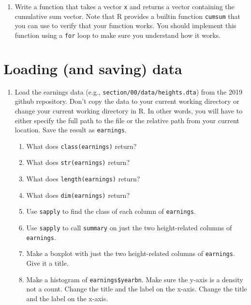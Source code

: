 \documentclass{article}
\begin{document}
\begin{enumerate}
\item Write a function that takes a vector \texttt{x} and returns a vector
      containing the cumulative sum vector.  Note that R provides a builtin
      function \texttt{cumsum} that you can use to verify that your function
      works.  You should implement this function using a \texttt{for} loop
      to make sure you understand how it works.

\end{enumerate}

\section*{Loading (and saving) data}

\begin{enumerate}

\item Load the earnings data (e.g., \texttt{section/00/data/heights.dta}) from the 2019 github repository.
      Don't copy the data to your
      current working directory or change your current working directory in
      R.  In other words, you will have to either specify the full path
      to the file or the relative path from your current location.  Save
      the result as \texttt{earnings}.

    \begin{enumerate}
    \item What does \texttt{class(earnings)} return?
    \item What does \texttt{str(earnings)} return?
    \item What does \texttt{length(earnings)} return?
    \item What does \texttt{dim(earnings)} return?
    \item Use \texttt{sapply} to find the class of each column of
          \texttt{earnings}.
    \item Use \texttt{sapply} to call \texttt{summary} on just the two
          height-related columns of \texttt{earnings}.
    \item Make a boxplot with just the two height-related columns of
          \texttt{earnings}. Give it a title.
    \item Make a histogram of \texttt{earnings\$yearbn}. Make sure the
          y-axis is a density not a count. Change the title and the
          label on the x-axis. Change the title and the
          label on the x-axis. 
    \end{enumerate}



\end{enumerate}
\end{document}
